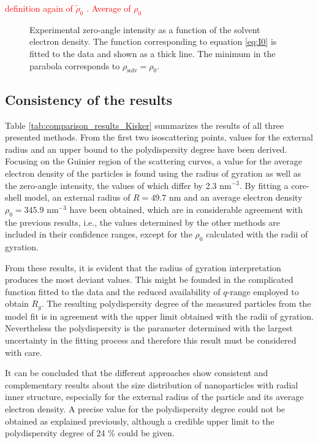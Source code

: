 \textcolor{red}{definition again of  $\tilde \rho_0$ . Average of  $\rho_0$ }

\begin{figure}%
	\centering
		
		\caption[Zero-angle intensity of the PS-COOH particles.]{Experimental zero-angle intensity as a function of the solvent electron density. The function corresponding to equation \eqref{eq:I0} is fitted to the data and shown as a thick line. The minimum in the parabola corresponds to $\rho_{\text{solv}}=\rho_0$.}
		\label{fig:KiskerIntensityParabola}
\end{figure}

\subsection{Consistency of the results}
Table \ref{tab:comparison_results_Kisker} summarizes the results of all three presented methods. From the first two isoscattering points, values for the external radius and an upper bound to the polydispersity degree have been derived. Focusing on the Guinier region of the scattering curves, a value for the average electron density of the particles is found using the radius of gyration as well as the zero-angle intensity, the values of which differ by 2.3 nm\(^{-3}\). By fitting a core-shell model, an external radius of \(R=49.7\) nm and an average electron density \(\rho_0=345.9\) nm\(^{-3}\) have been obtained, which are in considerable agreement with the previous results, i.e., the values determined by the other methods are included in their confidence ranges, except for the \(\rho_0\) calculated with the radii of gyration.

From these results, it is evident that the radius of gyration interpretation produces the most deviant values. This might be founded in the complicated function fitted to the data and the reduced availability of $q$-range employed to obtain \( R_g \). The resulting polydispersity degree of the measured particles from the model fit is in agreement with the upper limit obtained with the radii of gyration. Nevertheless the polydispersity is the parameter determined with the largest uncertainty in the fitting process and therefore this result must be considered with care.

It can be concluded that the different approaches show consistent and complementary results about the size distribution of nanoparticles with radial inner structure, especially for the external radius of the particle and its average electron density. A precise value for the polydispersity degree could not be obtained as explained previously, although a credible upper limit to the polydispersity degree of 24 $\%$ could be given.

